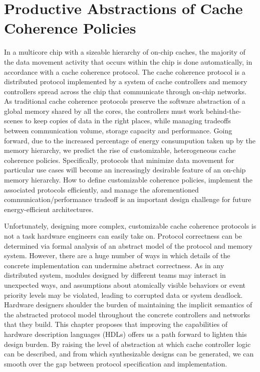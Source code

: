 \chapter{Productive Abstractions of Cache Coherence Policies}
\label{c.coherence}

In a multicore chip with a sizeable hierarchy of on-chip caches,
the majority of the data movement activity that occurs within the chip
is done automatically, in accordance with a cache coherence protocol.
The cache coherence protocol is a distributed protocol implemented by a system of cache controllers and memory controllers
spread across the chip that communicate through on-chip networks.
As traditional cache coherence protocols preserve the software abstraction of a global memory shared by all the cores,
the controllers must work behind-the-scenes to keep copies of data in the right places,
while managing tradeoffs between communication volume, storage capacity and performance.
Going forward, due to the increased percentage of energy consumpution taken up by the memory hierarchy,
we predict the rise of customizable, heterogeneous cache coherence policies.
Specifically, protocols that minimize data movement for particular use cases
will become an increasingly desirable feature of an on-chip memory hierarchy.
How to define customizable coherence policies, implement the associated protocols efficiently,
and manage the aforementioned communication/performance tradeoff is an important design challenge for future energy-efficient architectures. 

Unfortunately, designing more complex, customizable cache coherence protocols is not a task hardware engineers can easily take on.
Protocol correctness can be determined via formal analysis of an abstract model of the protocol and memory system.
However, there are a huge number of ways in which details of the concrete implementation can undermine abstract correctness.
As in any distributed system, modules designed by different teams may interact in unexpected ways,
and assumptions about atomically visible behaviors or event priority levels may be violated,
leading to corrupted data or system deadlock.
Hardware designers shoulder the burden of maintaining the implicit semantics of the abstracted protocol model
throughout the concrete controllers and networks that they build.
This chapter proposes that improving the capabilities of hardware description languages (HDLs) offers us a path forward to lighten this design burden.
By raising the level of abstraction at which cache controller logic can be described,
and from which synthesizable designs can be generated,
we can smooth over the gap between protocol specification and implementation.

